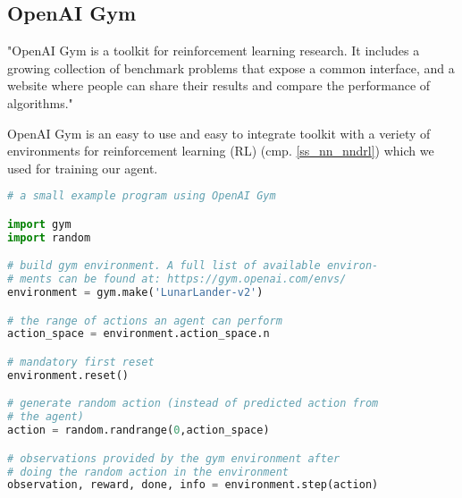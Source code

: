 \subsection{OpenAI Gym}
\label{s_openai_gym}

"OpenAI Gym is a toolkit for reinforcement learning
research. It includes a growing collection of benchmark
problems that expose a common interface, and a website
where people can share their results and compare the
performance of algorithms."\cite{gym}

OpenAI Gym is an easy to use and easy to integrate toolkit
with a veriety of environments for reinforcement learning
(RL) (cmp. \ref{ss_nn_nndrl}) which we used for training
our agent.

\begin{mdframed}[style=codebox]
\begin{lstlisting}[language=Python]
# a small example program using OpenAI Gym

import gym
import random

# build gym environment. A full list of available environ-
# ments can be found at: https://gym.openai.com/envs/
environment = gym.make('LunarLander-v2')

# the range of actions an agent can perform
action_space = environment.action_space.n

# mandatory first reset
environment.reset()

# generate random action (instead of predicted action from
# the agent)
action = random.randrange(0,action_space)

# observations provided by the gym environment after
# doing the random action in the environment
observation, reward, done, info = environment.step(action)

\end{lstlisting}
\end{mdframed}
